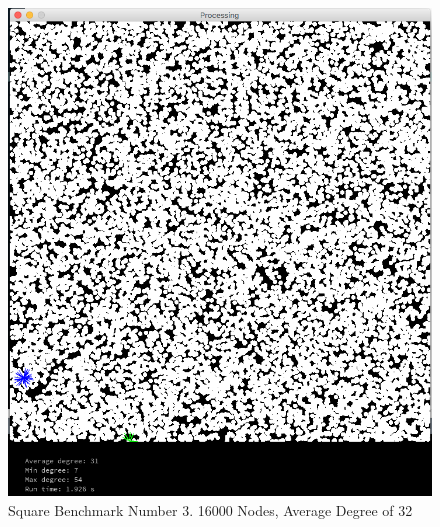 \documentclass{article}
\begin{document}
\begin{figure}
    \centering
    \includegraphics[scale=0.45]{./images/square_2.png}
    \caption{Square Benchmark Number 3. 16000 Nodes, Average Degree of 32}
    \label{square2}
\end{figure}
\end{document}
